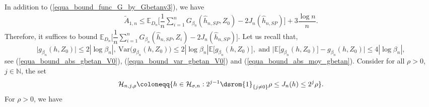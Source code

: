 \documentclass[10pt,twoside]{article}
\numberwithin{equation}{section}
\newcommand{\E}{\ensuremath{\mathbb{E}}}
\newcommand{\N}{\ensuremath{\mathbb{N}}}
\newcommand{\var}{\ensuremath{\mathrm{Var}}}
\def \ind{\textrm{\dsrom{1}}}
\begin{document}
%
In addition to (\ref{equa_bound_func_G_by_Gbetanv3}), we have
%
\begin{align}\label{equa_bound_func_G_by_Gbetanv4}
\widetilde{A}_{1, n} \leq \E_{D_n}\Bigg[\dfrac{1}{n} \sum_{i=1}^n G_{\beta_n}(\widehat{h}_{n,SP}, Z_0) -2J_n(\widehat{h}_{n,SP}) \Bigg] + 3\dfrac{\log n}{n}.
\end{align}
%
%
Therefore, it suffices to bound $\E_{D_n}\Big[\dfrac{1}{n} \sum_{i=1}^n G_{\beta_n}(\widehat{h}_{n,SP}, Z_i) -2J_n(\widehat{h}_{n,SP}) \Big]$. 
%
Let us recall that,
%
\begin{equation}\label{equa_bound_abs_gbetan}
   \big|g_{\beta_n}(h, Z_0) \big| \leq 2|\log \beta_n|, ~ \var \big(g_{\beta_n}(h, Z_0) \big) \leq 2|\log \beta_n| \E\big[g_{\beta_n}(h, Z_0)\big], \text{ and }     \Big|\E\big[g_{\beta_n}(h, Z_0)\big] - g_{\beta_n}(h, Z_0)\Big| \leq 4|\log \beta_n|,
\end{equation}
%
see (\ref{equa_bound_abs_gbetan_V0}), (\ref{equa_bound_var_gbetan_V0}) and (\ref{equa_bound_abs_moy_gbetan}).
%
Consider for all $\rho >0$, $j \in \N$, the set 
%
\begin{equation*}
 \mathcal{H}_{n, j, \rho} \coloneqq  \{ h \in \mathcal{H}_{\sigma, n}: 2^{j - 1} \ind_ {\{j \ne 0 \} } \rho  \leq J_n(h) \leq  2^{j} \rho \}.   
\end{equation*}
%
For $\rho > 0$, we have
%
\end{document}

